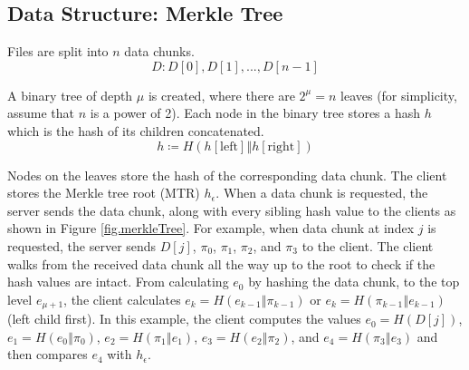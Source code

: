 \subsection{Data Structure: Merkle Tree}

Files are split into $n$ data chunks.
$$
D: D[0], D[1], ..., D[n-1]
$$

A binary tree of depth $\mu$ is created, where there are $2^\mu = n$ leaves (for simplicity, assume that $n$ is a power of 2). Each node in the binary tree stores a hash $h$ which is the hash of its children concatenated.
$$
h \coloneqq H(h[\mathrm{left}] \mathbin\Vert h[\mathrm{right}])
$$

Nodes on the leaves store the hash of the corresponding data chunk. The client stores the Merkle tree root (MTR) $h_\epsilon$. When a data chunk is requested, the server sends the data chunk, along with every sibling hash value to the clients as shown in Figure \ref{fig.merkleTree}. For example, when data chunk at index $j$ is requested, the server sends $D[j]$, $\pi_0$, $\pi_1$, $\pi_2$, and $\pi_3$ to the client. The client walks from the received data chunk all the way up to the root to check if the hash values are intact. From calculating $e_0$ by hashing the data chunk, to the top level $e_{\mu+1}$, the client calculates $e_k = H(e_{k-1} \mathbin\Vert \pi_{k-1})$ or $e_k = H(\pi_{k-1} \mathbin\Vert e_{k-1})$(left child first). In this example, the client computes the values $e_0 = H(D[j])$, $e_1 = H(e_0 \mathbin\Vert \pi_0)$, $e_2 = H(\pi_1 \mathbin\Vert e_1)$, $e_3 = H(e_2 \mathbin\Vert \pi_2)$, and $e_4 = H(\pi_3 \mathbin\Vert e_3)$ and then compares $e_4$ with $h_\epsilon$.

